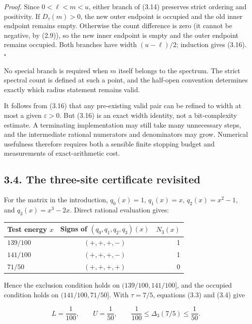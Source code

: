 \documentclass[
  11pt,
]{article}
\begin{document}
\emph{Proof.} Since \(0<\ell<m<u\), either branch of (3.14) preserves
strict ordering and positivity. If \(D_\tau(m)>0\), the new outer
endpoint is occupied and the old inner endpoint remains empty. Otherwise
the count difference is zero (it cannot be negative, by (2.9)), so the
new inner endpoint is empty and the outer endpoint remains occupied.
Both branches have width \((u-\ell)/2\); induction gives (3.16).
\(\square\)

No special branch is required when \(m\) itself belongs to the spectrum.
The strict spectral count is defined at such a point, and the half-open
convention determines exactly which radius statement remains valid.

It follows from (3.16) that any pre-existing valid pair can be refined
to width at most a given \(\varepsilon>0\). But (3.16) is an exact width
identity, not a bit-complexity estimate. A terminating implementation
may still take many unnecessary steps, and the intermediate rational
numerators and denominators may grow. Numerical usefulness therefore
requires both a sensible finite stopping budget and measurements of
exact-arithmetic cost.

\subsection{3.4. The three-site certificate
revisited}\label{the-three-site-certificate-revisited}

For the matrix in the introduction, \(q_0(x)=1\), \(q_1(x)=x\),
\(q_2(x)=x^2-1\), and \(q_3(x)=x^3-2x\). Direct rational evaluation
gives:

\begin{longtable}[]{@{}lcr@{}}
\toprule\noalign{}
Test energy \(x\) & Signs of \((q_0,q_1,q_2,q_3)(x)\) & \(N_3(x)\) \\
\midrule\noalign{}
\endhead
\bottomrule\noalign{}
\endlastfoot
\(139/100\) & \((+,+,+,-)\) & 1 \\
\(141/100\) & \((+,+,+,-)\) & 1 \\
\(71/50\) & \((+,+,+,+)\) & 0 \\
\end{longtable}

Hence the exclusion condition holds on \((139/100,141/100]\), and the
occupied condition holds on \((141/100,71/50]\). With \(\tau=7/5\),
equations (3.3) and (3.4) give

\[
L=\frac1{100},\qquad U=\frac1{50},\qquad
\frac1{100}\le\Delta_3(7/5)\le\frac1{50}.
\tag{3.17}
\]
\end{document}
